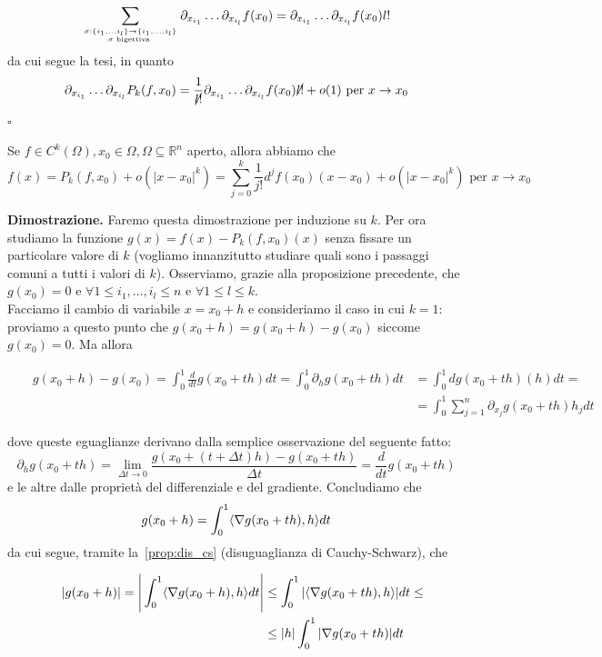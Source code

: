$$
\sum_{\sigma: \{i_1, \ldots i_l \} \to \{ i_1, \ldots, i_l \} \atop \sigma \text{ bigettiva }} \partial_{x_{i_1}} \ldots \partial_{x_{i_l}} f(x_0) = \partial_{x_{i_1}} \ldots \partial_{x_{i_l}} f(x_0) l!
$$
da cui segue la tesi, in quanto
$$
\partial_{x_{i_1}} \ldots \partial_{x_{i_l}} P_k(f, x_0) = \frac{1}{\cancel{l!}} \partial_{x_{i_1}} \ldots \partial_{x_{i_l}} f(x_0) \cancel{l!} + o(1) \text{ per } x \to x_0
$$
\hfill $\square$

\vspace{0.5cm}
\begin{theorem}[\textcolor{blue}{formula di Taylor}]
Se $f \in C^k ( \Omega ), x_0 \in \Omega, \Omega \subseteq \mathbb{R}^n$ aperto, allora abbiamo che
$$
f(x) = P_k(f, x_0) + o(|x-x_0|^k) = \sum_{j=0}^k \frac{1}{j!} d^j f(x_0)(x-x_0) + o(|x-x_0|^k) \text{ per } x \to x_0
$$
\label{thm:form_taylor}
\end{theorem}

\noindent \textbf{Dimostrazione. }
Faremo questa dimostrazione per induzione su $k$. Per ora studiamo la funzione $g(x)=f(x)-P_k(f, x_0)(x)$ senza fissare un particolare valore di $k$ (vogliamo innanzitutto studiare quali sono i passaggi comuni a tutti i valori di $k$). Osserviamo, grazie alla proposizione precedente, che $g(x_0) = 0$ e $\forall 1 \leq i_1, \ldots, i_l \leq n$ e $\forall 1 \leq l \leq k$. \\
Facciamo il cambio di variabile $x = x_0 + h$ e consideriamo il caso in cui $k=1$: proviamo a questo punto che $g(x_0+h) = g(x_0 + h) - g(x_0)$ siccome $g(x_0) = 0$. Ma allora

\[\begin{aligned}
& & g(x_0 + h) - g(x_0) = \int_0^1 \frac{d}{dt} g(x_0 + th)dt = \int_0^1 \partial_h g(x_0 + th)dt &= \int_0^1 dg(x_0 + th)(h)dt = & \\
& & &=\int_0^1 \sum_{j=1}^n \partial_{x_j} g(x_0 + th) h_j dt
\end{aligned}\]

dove queste eguaglianze derivano dalla semplice osservazione del seguente fatto:
$$
\partial_h g(x_0 + th) = \lim_{\Delta t \to 0} \frac{g(x_0 + (t+\Delta t)h) - g(x_0 + th)}{\Delta t} = \frac{d}{dt} g(x_0 + th)
$$
e le altre dalle proprietà del differenziale e del gradiente. Concludiamo che
$$
g(x_0 + h) = \int_{0}^1 \langle \nabla g(x_0 + th), h \rangle dt
$$
da cui segue, tramite la~\ref{prop:dis_cs} (disuguaglianza di Cauchy-Schwarz), che 

\[\begin{aligned}
& & |g(x_0 + h)| = \Bigg| \int_{0}^1 \langle \nabla g(x_0 + h), h \rangle dt  \Bigg| &\leq \int_{0}^{1} | \langle \nabla g(x_0+th), h \rangle|dt \leq \\
& & &\leq |h| \int_0^1 |\nabla g(x_0 + th)| dt
\end{aligned}\]

